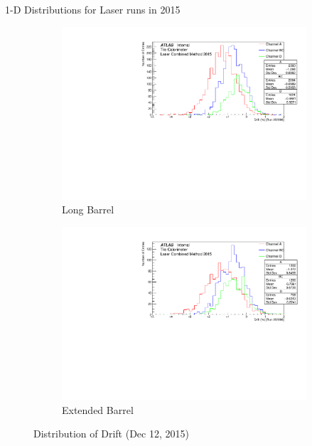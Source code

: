 \documentclass{beamer}
\begin{document}
\begin{frame}{1-D Distributions for Laser runs in 2015}
\begin{figure}[H]
\centering
\begin{subfigure} [t] {0.49\textwidth}
\includegraphics[width=\textwidth]{LB3.pdf}
\caption{Long Barrel}
\end{subfigure}
\begin{subfigure} [t] {0.49\textwidth}
\includegraphics[width=\textwidth]{EB3.pdf}
\caption{Extended Barrel}
\end{subfigure}
\caption{Distribution of Drift (Dec 12, 2015)}
\end{figure}
\end{frame}
\end{document}
